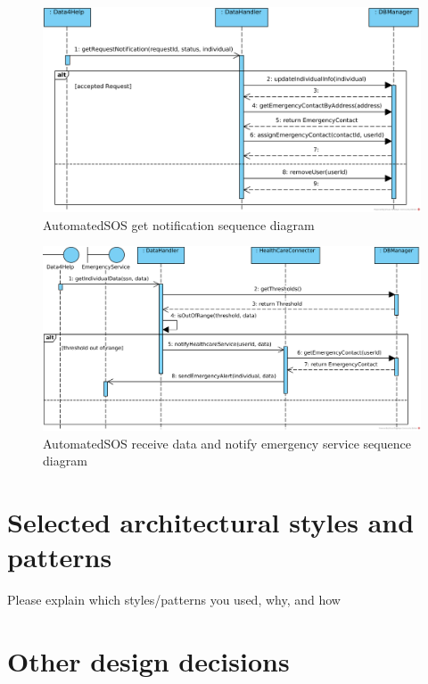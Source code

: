 \documentclass[a4paper, hidelinks, 12pt]{report}
\begin{document}
	\begin{figure}[H]
		\centering
		\includegraphics[width=1\textwidth]{diagrams/sequence_diagrams/asos_get_individual_notification.png}
		\caption[AutomatedSOS get notification sequence diagram]{AutomatedSOS get notification sequence diagram}
		\label{fig:asos_seq_get_notification}
	\end{figure}
	
	\begin{figure}[H]
		\centering
		\includegraphics[width=1\textwidth]{diagrams/sequence_diagrams/asos_receive_individual_data_and_notify_emergency_service.png}
		\caption[AutomatedSOS receive data and notify emergency service sequence diagram]{AutomatedSOS receive data and notify emergency service sequence diagram}
		\label{fig:asos_seq_receive_data}
	\end{figure}
	
	\section{Selected architectural styles and patterns}
	Please explain which styles/patterns you
used, why, and how 

	\section{Other design decisions}
	
\end{document}
